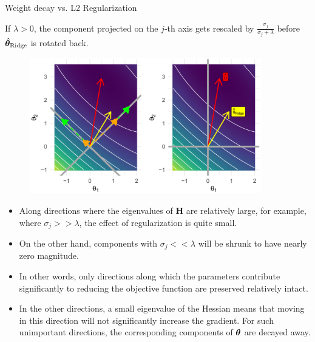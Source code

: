 \begin{vbframe}{Weight decay vs. L2 Regularization}
\framebreak

If $\lambda > 0$, the component projected on the $j$-th axis gets rescaled by $\frac{\sigma_j}{\sigma_j + \lambda}$ before $\hat{\bm{\theta}}_{\text{Ridge}}$ is rotated back.

\begin{figure}
\includegraphics[width=0.9\textwidth]{figure_man/L2-regularization05.png}\\
\end{figure}


\framebreak


\begin{itemize}
  \item Along directions where the eigenvalues of $\bm{H}$ are relatively large, for example, where $\sigma_j >> \lambda$, the effect of regularization is quite small.
  \item On the other hand, components with $\sigma_j << \lambda$ will be shrunk to have nearly zero magnitude.
  \item In other words, only directions along which the parameters contribute significantly to reducing the objective function are preserved relatively intact.
  \item In the other directions, a small eigenvalue of the Hessian means that moving in this direction will not significantly increase the gradient. For such unimportant directions, the corresponding components of $\bm{\theta}$ are decayed away.
  \end{itemize}

  \framebreak


\end{vbframe}
